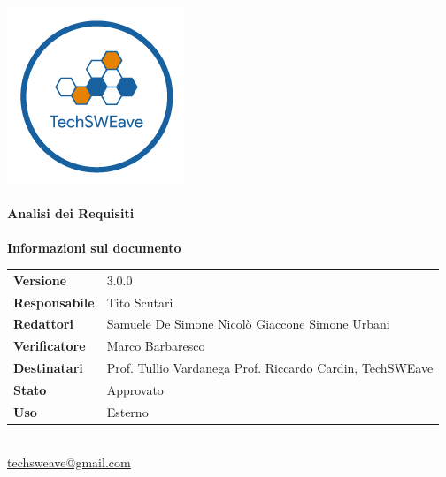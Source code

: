 \documentclass[a4paper]{article}
\begin{document}
\begin{titlepage}
    \begin{center}
        \includegraphics{../../../Images/logo.png}\\
        \vspace{20px}
        \textcolor{logo}{\hrulefill}\\
        \vspace{20px}
        \textbf{\huge\textcolor{logo}{Analisi dei Requisiti}}\\
        \vspace{10px}
        \textcolor{logo}{\hrulefill}\\
        \vspace{40px}
        \textbf{\Large Informazioni sul documento}\\
        \vspace{20px}
        \begin{tabular}{p{100px} | p{100px}}
            \textbf{Versione}     & 3.0.0                                                                      \\
            \textbf{Responsabile} & Tito Scutari                                                               \\
            \textbf{Redattori}    & Samuele De Simone \newline Nicolò Giaccone \newline Simone Urbani          \\
            \textbf{Verificatore} & Marco Barbaresco                                                           \\
            \textbf{Destinatari}  & Prof. Tullio Vardanega \newline Prof. Riccardo Cardin, \newline TechSWEave \\
            \textbf{Stato}        & Approvato                                                                  \\
            \textbf{Uso}          & Esterno                                                                    \\
        \end{tabular}\\
        \vspace{60px}
        \href{mailto:techsweave@gmail.com}{techsweave@gmail.com}\\

    \end{center}
\end{titlepage}
\end{document}

